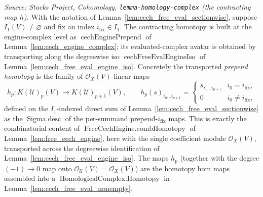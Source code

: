 \begin{lemma}
  \label{lem:cech_free_eval_prepend_homotopy}
  \textit{Source: Stacks Project, Cohomology, \texttt{lemma-homology-complex}
  (the contracting map \(h\)).}
  With the notation of Lemma~\ref{lem:cech_free_eval_sectionwise}, suppose
  \(I_1(V) \neq \varnothing\) and fix an index \(i_{\mathrm{fix}} \in I_1\). The
  contracting homotopy is built at the engine-complex level as
  \(\operatorname{cechEnginePrepend}\) of Lemma~\ref{lem:cech_engine_complex}; its
  evaluated-complex avatar is obtained by transporting along the degreewise iso
  \(\operatorname{cechFreeEvalEngineIso}\) of
  Lemma~\ref{lem:cech_free_eval_engine_iso}. Concretely the transported
  \emph{prepend homotopy} is the family of \(\mathcal{O}_X(V)\)-linear maps
  \[
    h_p : K(\mathcal{U})_p(V) \longrightarrow K(\mathcal{U})_{p+1}(V),
    \qquad
    h_p(s)_{i_0 \ldots i_{p+1}} =
      \begin{cases}
        s_{i_1 \ldots i_{p+1}} & i_0 = i_{\mathrm{fix}}, \\
        0 & i_0 \neq i_{\mathrm{fix}},
      \end{cases}
  \]
  defined on the \(I_1\)-indexed direct sum of
  Lemma~\ref{lem:cech_free_eval_sectionwise} as the \(\operatorname{Sigma.desc}\) of
  the per-summand prepend-\(i_{\mathrm{fix}}\) maps. This is exactly the
  combinatorial content of \(\operatorname{FreeCechEngine.combHomotopy}\) of
  Lemma~\ref{lem:free_cech_engine}, here with the single
  coefficient module \(\mathcal{O}_X(V)\), transported across the degreewise
  identification of Lemma~\ref{lem:cech_free_eval_engine_iso}. The maps \(h_p\) (together with the
  degree \((-1)\!\to\!0\) map onto \(\mathcal{O}_{\mathcal{U}}(V) = \mathcal{O}_X(V)\))
  are the homotopy hom maps assembled into a
  \(\operatorname{HomologicalComplex.Homotopy}\) in
  Lemma~\ref{lem:cech_free_eval_nonempty}.
\end{lemma}

